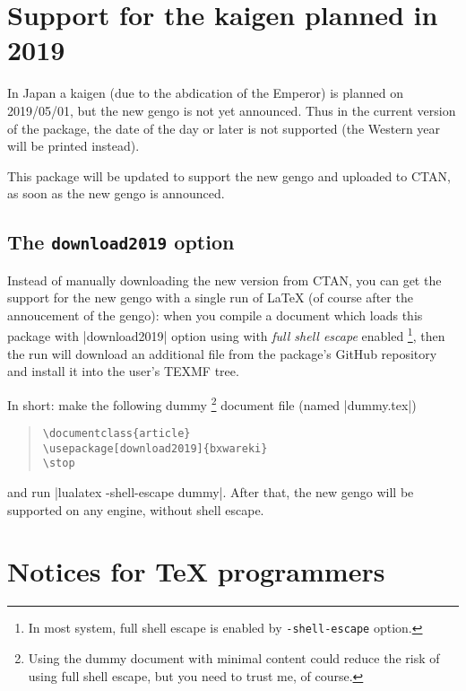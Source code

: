 \documentclass[a4paper]{article}
\newcommand*{\+}{\hspace{0.25em minus 0.25em}}
\begin{document}
\section{Support for the kaigen planned in 2019}
\label{sec:Kaigen}

In Japan a kaigen (due to the abdication of the Emperor)
is planned on 2019/05/01,
but the new gengo is not yet announced.
Thus in the current version of the package,
the date of the day or later is not supported
(the Western year will be printed instead).

This package will be updated to support the new gengo
and uploaded to CTAN,
as soon as the new gengo is announced.

\subsection{The \texttt{download2019} option}
\label{ssec:download2019}

Instead of manually downloading the new version from CTAN,
you can get the support for the new gengo
with a single run of {\LaTeX}
(of course after the annoucement of the gengo):
when you compile a document which loads this package
with |download2019| option using {\LuaLaTeX}
with \emph{full shell escape} enabled%
\footnote{In most system, full shell escape is enabled
  by \texttt{-shell-escape} option.},
then the run will download an additional file
from the package's GitHub repository
and install it into the user's TEXMF tree.

In short: make the following dummy%
\footnote{Using the dummy document with minimal content
could reduce the risk of using full shell escape,
but you need to trust me, of course.}
document file (named |dummy.tex|)
\begin{quote}\small\begin{verbatim}
\documentclass{article}
\usepackage[download2019]{bxwareki}
\stop
\end{verbatim}\end{quote}
and run |lualatex -shell-escape dummy|.
After that, the new gengo will be supported
on any engine, without shell escape.

\section{Notices for {\TeX} programmers}
\label{sec:Allez}
\end{document}

